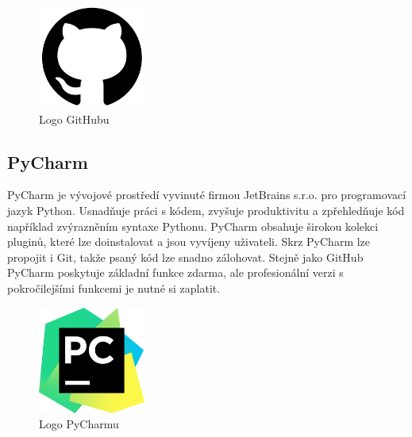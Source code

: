 \begin{figure}[H] \centering
    \includegraphics[width=100pt]{./pictures/github.png}
    \caption[Logo GitHubu]{Logo GitHubu \cite{github}}
	\label{fig:github}                                
\end{figure} 

\subsection{PyCharm}

PyCharm je vývojové prostředí vyvinuté firmou JetBrains s.r.o. pro programovací jazyk Python.
Usnadňuje práci s kódem, zvyšuje produktivitu a zpřehledňuje kód například zvýrazněním syntaxe Pythonu.
PyCharm obsahuje širokou kolekci plu\-ginů, které lze doinstalovat a jsou vyvíjeny uživateli.
Skrz PyCharm lze propojit i Git, takže psaný kód lze snadno zálohovat. Stejně jako GitHub PyCharm poskytuje 
základní funkce zdarma, ale profesionální verzi s pokročilejšími funkcemi je nutné si zaplatit.

\begin{figure}[H] \centering
    \includegraphics[width=100pt]{./pictures/pycharm.png}
    \caption[Logo PyCharmu]{Logo PyCharmu \cite{pycharm}}
	\label{fig:pycharm}                                
\end{figure} 
 